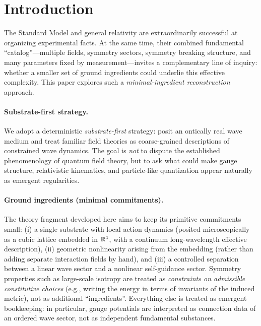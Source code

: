 \section{Introduction}
\label{sec:introduction}

The Standard Model and general relativity are extraordinarily successful at organizing experimental facts.
At the same time, their combined fundamental ``catalog''---multiple fields, symmetry sectors, symmetry breaking
structure, and many parameters fixed by measurement---invites a complementary line of inquiry:
whether a smaller set of ground ingredients could underlie this effective complexity.
This paper explores such a \emph{minimal-ingredient reconstruction} approach.

\paragraph{Substrate-first strategy.}
We adopt a deterministic \emph{substrate-first} strategy: posit an ontically real wave medium and treat familiar
field theories as coarse-grained descriptions of constrained wave dynamics.
The goal is \emph{not} to dispute the established phenomenology of quantum field theory, but to ask what could make
gauge structure, relativistic kinematics, and particle-like quantization appear naturally as emergent regularities.

\paragraph{Ground ingredients (minimal commitments).}
The theory fragment developed here aims to keep its primitive commitments small:
(i) a single substrate with local action dynamics (posited microscopically as a cubic lattice embedded in $\mathbb{R}^4$, with a continuum long-wavelength effective description),
(ii) geometric nonlinearity arising from the embedding (rather than adding separate interaction fields by hand), and
(iii) a controlled separation between a linear wave sector and a nonlinear self-guidance sector.
Symmetry properties such as large-scale isotropy are treated as \emph{constraints on admissible constitutive choices}
(e.g., writing the energy in terms of invariants of the induced metric), not as additional ``ingredients''.
Everything else is treated as emergent bookkeeping: in particular, gauge potentials are interpreted as connection
data of an ordered wave sector, not as independent fundamental substances.


